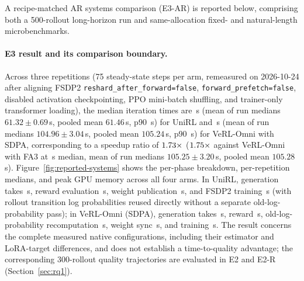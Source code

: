\documentclass[10pt]{article}
\begin{document}
A recipe-matched AR systems comparison (E3-AR) is reported below, comprising both a 500-rollout long-horizon run and same-allocation fixed- and natural-length microbenchmarks.

\begin{table}[H]
\caption{Raw-log-verified E3 native-recipe systems timings and E5-T deployment-topology timings across three repetitions $\times$ 25 steady-state steps per arm on one reserved eight-GPU H20 node. ``s/iter'' reports the steady-state median step time; phase columns report median generation, reward, weight-sync, training, and (for VeRL-Omni) old-log-probability recomputation times; memory columns report peak actor-allocated, actor-reserved, and device-used memory.}
\label{tab:rq2}
\centering
\scriptsize

\end{table}

\paragraph{E3 result and its comparison boundary.}
Across three repetitions (75 steady-state steps per arm, remeasured on 2026-10-24 after aligning FSDP2 \texttt{reshard\_after\_forward=false}, \texttt{forward\_prefetch=false}, disabled activation checkpointing, PPO mini-batch shuffling, and trainer-only transformer loading), the median iteration times are \ReportedUniRLSeconds{}\,s (mean of run medians $61.32 \pm 0.69$\,s, pooled mean $61.46$\,s, p90 \EThreeUniRLPNinetySeconds{}\,s) for UniRL and \ReportedSDPASeconds{}\,s (mean of run medians $104.96 \pm 3.04$\,s, pooled mean $105.24$\,s, p90 \EThreeVeRLSDPAPNinetySeconds{}\,s) for VeRL-Omni with SDPA, corresponding to a speedup ratio of $1.73{}\times$ ($1.75{}\times$ against VeRL-Omni with FA3 at \ReportedFAThreeSeconds{}\,s median, mean of run medians $105.25 \pm 3.20$\,s, pooled mean $105.28$\,s).
Figure~\ref{fig:reported-systems} shows the per-phase breakdown, per-repetition medians, and peak GPU memory across all four arms.
In UniRL, generation takes \EThreeUniRLGenSeconds{}\,s, reward evaluation \EThreeUniRLRewardSeconds{}\,s, weight publication \EThreeUniRLSyncSeconds{}\,s, and FSDP2 training \EThreeUniRLTrainSeconds{}\,s (with rollout transition log probabilities reused directly without a separate old-log-probability pass); in VeRL-Omni (SDPA), generation takes \EThreeVeRLSDPAGenSeconds{}\,s, reward \EThreeVeRLSDPARewardSeconds{}\,s, old-log-probability recomputation \EThreeVeRLSDPAOldLPSeconds{}\,s, weight sync \EThreeVeRLSDPASyncSeconds{}\,s, and training \EThreeVeRLSDPATrainSeconds{}\,s.
The result concerns the complete measured native configurations, including their estimator and LoRA-target differences, and does not establish a time-to-quality advantage; the corresponding 300-rollout quality trajectories are evaluated in E2 and E2-R (Section~\ref{sec:rq1}).
\end{document}
